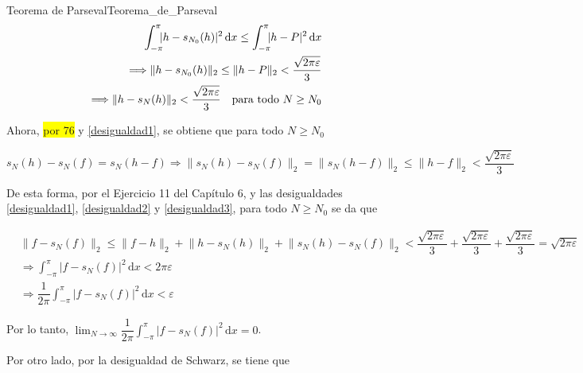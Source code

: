 \documentclass[fleqn]{article}
\newcounter{teore}
\newenvironment{teorema}[2]{\begin{teo}[breakable, pad at break = 5mm, leftrule = 0.7mm, rightrule = 0.7mm, right = 2mm, left = 2mm, enlarge bottom finally by = 3mm, fontupper = \setlength{\parskip}{2mm}, fontlower = \setlength{\parskip}{2mm}]{#1}{#2}}{\end{teo}}
\newcommand{\intg}[4]{\int_{#1}^{#2} \!\! #3 \, \mathrm{d} #4}
\begin{document}
\begin{teorema}{Teorema de Parseval}{Teorema_de_Parseval}
		\begin{align}
			\intg{-\pi}{\pi}{\lvert h - s_{N_0}(h) \rvert^2}{x} \leq \intg{-\pi}{\pi}{\lvert h - P \rvert^2}{x} \notag \\
			\Longrightarrow \lVert h - s_{N_0}(h) \rVert_2 \leq \lVert h - P \rVert_2 < \dfrac{\sqrt{2 \pi \varepsilon}}{3} \notag \\
			\Longrightarrow \lVert h - s_N (h) \rVert_2 < \dfrac{\sqrt{2 \pi \varepsilon}}{3} \quad \mbox{para todo } N \geq N_0 \label{desigualdad2}
		\end{align}

		Ahora, \colorbox{yellow}{por 76} y \eqref{desigualdad1}, se obtiene que para todo $ N \geq N_0 $

		\begin{equation}
			s_N (h) - s_N (f) = s_N(h - f) \Longrightarrow \lVert s_N (h) - s_N (f) \rVert_2 = \lVert s_N(h - f) \rVert_2 \leq \lVert h - f \rVert_2 < \dfrac{\sqrt{2 \pi \varepsilon}}{3} \label{desigualdad3}
		\end{equation}

		De esta forma, por el Ejercicio 11 del Capítulo 6, y las desigualdades \eqref{desigualdad1}, \eqref{desigualdad2} y \eqref{desigualdad3}, para todo $ N \geq N_0 $ se da que
		
		\begin{align*}
			&\lVert f - s_N (f) \rVert_2 \leq \lVert f - h \rVert_2 + \lVert h - s_N (h) \rVert_2 + \lVert s_N (h) - s_N (f) \rVert_2 < \dfrac{\sqrt{2 \pi \varepsilon}}{3} + \dfrac{\sqrt{2 \pi \varepsilon}}{3} + \dfrac{\sqrt{2 \pi \varepsilon}}{3} = \sqrt{2 \pi \varepsilon} \\
			&\Longrightarrow \intg{-\pi}{\pi}{\lvert f - s_N (f) \rvert^2}{x} < 2 \pi \varepsilon \\
			&\Longrightarrow \dfrac{1}{2 \pi} \intg{-\pi}{\pi}{\lvert f - s_N (f) \rvert^2}{x} < \varepsilon
		\end{align*}

		Por lo tanto, $ \displaystyle \lim_{N \to \infty} \dfrac{1}{2\pi} \intg{-\pi}{\pi}{\bigl\lvert f - s_N(f) \bigr\rvert^2}{x} = 0 $.

		Por otro lado, por la desigualdad de Schwarz, se tiene que
		

\end{teorema}
\end{document}
